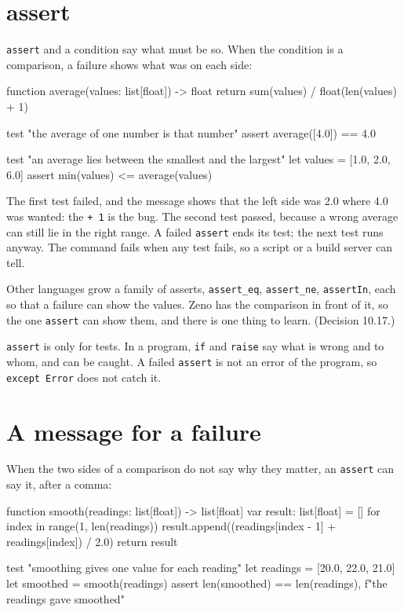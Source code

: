 \section{assert}

\verb|assert| and a condition say what must be so. When the condition
is a comparison, a failure shows what was on each side:

\begin{zeno}[file=average.zeno, dir=fail, cmd=zeno test {file}, fails=yes]
function average(values: list[float]) -> float {
    return sum(values) / float(len(values) + 1)
}

test "the average of one number is that number" {
    assert average([4.0]) == 4.0
}

test "an average lies between the smallest and the largest" {
    let values = [1.0, 2.0, 6.0]
    assert min(values) <= average(values)
}
\end{zeno}

The first test failed, and the message shows that the left side was
2.0 where 4.0 was wanted: the \verb|+ 1| is the bug. The second test
passed, because a wrong average can still lie in the right range. A
failed \verb|assert| ends its test; the next test runs anyway. The
command fails when any test fails, so a script or a build server can
tell.

\begin{why}
Other languages grow a family of asserts, \verb|assert_eq|,
\verb|assert_ne|, \verb|assertIn|, each so that a failure can show the
values. Zeno has the comparison in front of it, so the one
\verb|assert| can show them, and there is one thing to learn.
(Decision 10.17.)
\end{why}

\verb|assert| is only for tests. In a program, \verb|if| and
\verb|raise| say what is wrong and to whom, and can be caught. A failed
\verb|assert| is not an error of the program, so \verb|except Error|
does not catch it.

\section{A message for a failure}

When the two sides of a comparison do not say why they matter, an
\verb|assert| can say it, after a comma:

\begin{zeno}[file=smooth.zeno, dir=message, cmd=zeno test {file}, fails=yes]
function smooth(readings: list[float]) -> list[float] {
    var result: list[float] = []
    for index in range(1, len(readings)) {
        result.append((readings[index - 1] + readings[index]) / 2.0)
    }
    return result
}

test "smoothing gives one value for each reading" {
    let readings = [20.0, 22.0, 21.0]
    let smoothed = smooth(readings)
    assert len(smoothed) == len(readings), f"the readings gave {smoothed}"
}
\end{zeno}

